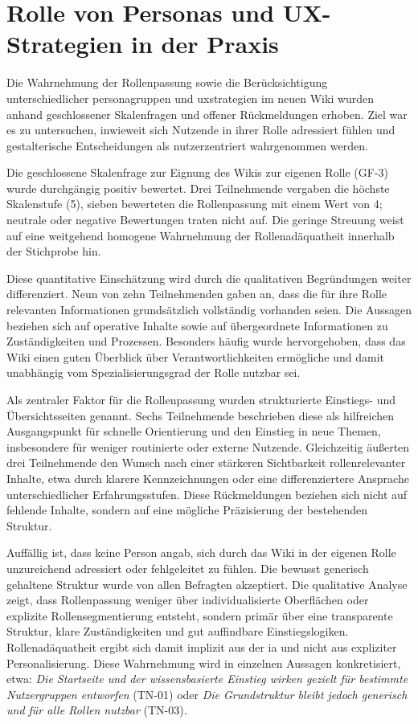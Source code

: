 \section{Rolle von Personas und UX-Strategien in der Praxis}
\label{sec:05-03_role-of-ux-methods}

Die Wahrnehmung der Rollenpassung sowie die Berücksichtigung unterschiedlicher \Gls{personagruppen} und \Gls{uxstrategien} im neuen Wiki wurden anhand geschlossener Skalenfragen und offener Rückmeldungen erhoben. Ziel war es zu untersuchen, inwieweit sich Nutzende in ihrer Rolle adressiert fühlen und gestalterische Entscheidungen als nutzerzentriert wahrgenommen werden.

Die geschlossene Skalenfrage zur Eignung des Wikis zur eigenen Rolle (GF-3) wurde durchgängig positiv bewertet. Drei Teilnehmende vergaben die höchste Skalenstufe (5), sieben bewerteten die Rollenpassung mit einem Wert von 4; neutrale oder negative Bewertungen traten nicht auf. Die geringe Streuung weist auf eine weitgehend homogene Wahrnehmung der Rollenadäquatheit innerhalb der Stichprobe hin.

Diese quantitative Einschätzung wird durch die qualitativen Begründungen weiter differenziert. Neun von zehn Teilnehmenden gaben an, dass die für ihre Rolle relevanten Informationen grundsätzlich vollständig vorhanden seien. Die Aussagen beziehen sich auf operative Inhalte sowie auf übergeordnete Informationen zu Zuständigkeiten und Prozessen. Besonders häufig wurde hervorgehoben, dass das Wiki einen guten Überblick über Verantwortlichkeiten ermögliche und damit unabhängig vom Spezialisierungsgrad der Rolle nutzbar sei.

Als zentraler Faktor für die Rollenpassung wurden strukturierte Einstiegs- und Übersichtsseiten genannt. Sechs Teilnehmende beschrieben diese als hilfreichen Ausgangspunkt für schnelle Orientierung und den Einstieg in neue Themen, insbesondere für weniger routinierte oder externe Nutzende. Gleichzeitig äußerten drei Teilnehmende den Wunsch nach einer stärkeren Sichtbarkeit rollenrelevanter Inhalte, etwa durch klarere Kennzeichnungen oder eine differenziertere Ansprache unterschiedlicher Erfahrungsstufen. Diese Rückmeldungen beziehen sich nicht auf fehlende Inhalte, sondern auf eine mögliche Präzisierung der bestehenden Struktur.

Auffällig ist, dass keine Person angab, sich durch das Wiki in der eigenen Rolle unzureichend adressiert oder fehlgeleitet zu fühlen. Die bewusst generisch gehaltene Struktur wurde von allen Befragten akzeptiert. Die qualitative Analyse zeigt, dass Rollenpassung weniger über individualisierte Oberflächen oder explizite Rollensegmentierung entsteht, sondern primär über eine transparente Struktur, klare Zuständigkeiten und gut auffindbare Einstiegslogiken. Rollenadäquatheit ergibt sich damit implizit aus der \Gls{ia} und nicht aus expliziter Personalisierung. Diese Wahrnehmung wird in einzelnen Aussagen konkretisiert, etwa:
\textit{\glqq Die Startseite und der wissensbasierte Einstieg wirken gezielt für bestimmte Nutzergruppen entworfen\grqq{}} (TN-01) oder
\textit{\glqq Die Grundstruktur bleibt jedoch generisch und für alle Rollen nutzbar\grqq{}} (TN-03).

